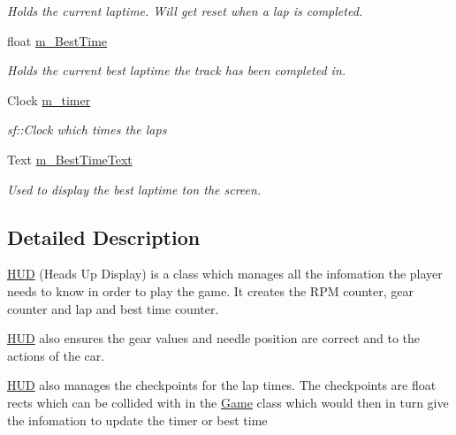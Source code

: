 \begin{DoxyCompactItemize}
\begin{DoxyCompactList}\small\item\em Holds the current laptime. Will get reset when a lap is completed. \end{DoxyCompactList}\item 
\hypertarget{class_h_u_d_a13c927adc958b14eeee251b4bef1d74f}{}float \hyperlink{class_h_u_d_a13c927adc958b14eeee251b4bef1d74f}{m\+\_\+\+Best\+Time}\label{class_h_u_d_a13c927adc958b14eeee251b4bef1d74f}

\begin{DoxyCompactList}\small\item\em Holds the current best laptime the track has been completed in. \end{DoxyCompactList}\item 
\hypertarget{class_h_u_d_acf91594e88c1f96b2cba58ee71f22d70}{}Clock \hyperlink{class_h_u_d_acf91594e88c1f96b2cba58ee71f22d70}{m\+\_\+timer}\label{class_h_u_d_acf91594e88c1f96b2cba58ee71f22d70}

\begin{DoxyCompactList}\small\item\em sf\+::\+Clock which times the laps \end{DoxyCompactList}\item 
\hypertarget{class_h_u_d_a5436abc1d486bd54e8577224c079ba5e}{}Text \hyperlink{class_h_u_d_a5436abc1d486bd54e8577224c079ba5e}{m\+\_\+\+Best\+Time\+Text}\label{class_h_u_d_a5436abc1d486bd54e8577224c079ba5e}

\begin{DoxyCompactList}\small\item\em Used to display the best laptime ton the screen. \end{DoxyCompactList}\end{DoxyCompactItemize}


\subsection{Detailed Description}
\hyperlink{class_h_u_d}{H\+U\+D} (Heads Up Display) is a class which manages all the infomation the player needs to know in order to play the game. It creates the R\+P\+M counter, gear counter and lap and best time counter.

\hyperlink{class_h_u_d}{H\+U\+D} also ensures the gear values and needle position are correct and to the actions of the car.

\hyperlink{class_h_u_d}{H\+U\+D} also manages the checkpoints for the lap times. The checkpoints are float rects which can be collided with in the \hyperlink{class_game}{Game} class which would then in turn give the infomation to update the timer or best time

